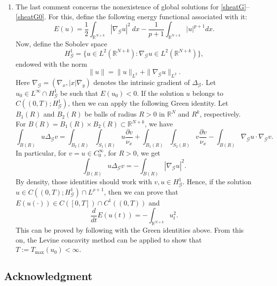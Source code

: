 \documentclass[12pt]{amsart}
\newcommand{\R}{\mathbb{R}}
\begin{document}
\begin{enumerate}
	\item[(e)] 
	The last comment concerns the nonexistence of global solutions for \eqref{sheatG}--\eqref{sheatG0}. For this, define the following energy functional associated with it:
	\begin{equation}
		E(u)=\frac{1}{2} \int_{\R^{N+k}} |\nabla_{\mathcal{G}} u|^2 \ dx - \frac{1}{p+1} \int_{\R^{N+k}}|u|^{p+1} d x .
	\end{equation}
	Now, define the Sobolev space
	$$H^1_\mathcal{G} = \{u\in L^2(\R^{N+k}): \nabla_{\mathcal{G}}u\in L^2(\R^{N+k})\} ,$$
	endowed with the norm
	$$\| u \| = \|u\|_{L^2} + \|\nabla_{\mathcal{G}}u\|_{L^2} .$$
	Here $\nabla_{\mathcal{G}} = (\nabla_x, |x|\nabla_y)$ denotes the intrinsic gradient of $\Delta_{\mathcal{G}}$.  Let $u_0 \in L^{\infty} \cap H_\mathcal{G}^1$ be such that $E(u_0)<0$. If the solution $u$ belongs to $C((0,T);H_\mathcal{G}^1)$, then we can apply the following Green identity. Let $B_1(R)$ and $B_2(R)$ be balls of radius $R>0$ in $\R^N$ and $R^k$, respectively. For $B(R) = B_1(R)\times B_2(R)\subset \R^{N+k}$, we have
	\begin{equation*}
		\int_{B(R)} u\Delta_{\mathcal{G}}v = \int_{B_2(R)}\int_{S_1(R)} u\frac{\partial v}{\nu_x} + \int_{B_1(R)}\int_{S_2(R)} v\frac{\partial v}{\nu_x} 
		-\int_{B(R)} \nabla_{\mathcal{G}}u\cdot \nabla_{\mathcal{G}} v .
	\end{equation*}
	In particular, for $v=u \in C_0^\infty$, for $R>0$, we get
	\begin{equation*}
		\int_{B(R)} u\Delta_{\mathcal{G}}v = -\int_{B(R)} |\nabla_{\mathcal{G}}u|^2 .
	\end{equation*}
	By density, those identities should work with $v,u\in H_\mathcal{G}^1$. Hence, if the solution $u\in C((0,T);H_\mathcal{G}^1)\cap L^{\rho+1}$, then we can prove that $E(u(\cdot)) \in C([0,T])\cap C^1((0,T))$ and 
	\begin{equation*}
		\frac{d}{dt}E(u(t)) = - \int_{\R^{N+k}} u_t^2 .
	\end{equation*}
	This can be proved by following \cite[Lemma 17.5]{Soup-Quit-07} with the Green identities above. From this on, the Levine concavity method \cite{Levine73} can be applied to show that  $T:=T_{\max }\left(u_0\right)<\infty$.

\end{enumerate}


\subsection*{Acknowledgment}
\end{document}
